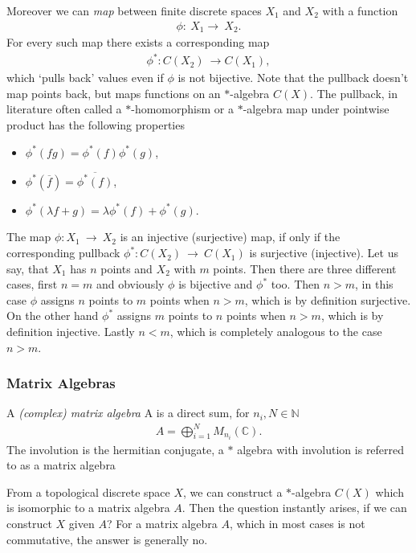 Moreover we can \textit{map} between finite discrete spaces $X_1$ and $X_2$ with a
function
\begin{align}
    \phi:\ X_1 \rightarrow\ X_2.
\end{align}
For every such map there exists a corresponding map
\begin{align}
    \phi ^*:C(X_2)\ \rightarrow C(X_1),
\end{align}
which `pulls back' values even if $\phi$ is not bijective.
Note that the pullback doesn't map points back, but maps functions on an $*$-algebra $C(X)$.
The pullback, in literature often called a $*$-homomorphism or a $*$-algebra map under
pointwise product has the following properties
\begin{itemize}
    \item $\phi ^*(fg) = \phi ^*(f) \phi ^*(g)$,
    \item $\phi ^*(\overline{f}) = \overline{\phi ^*(f)}$,
    \item $\phi ^*(\lambda f + g) = \lambda \phi ^*(f) + \phi ^*(g)$.
\end{itemize}
    The map $\phi :X_1\ \rightarrow \ X_2$ is an injective (surjective) map,
    if only if the corresponding pullback $\phi ^* :C(X_2)\ \rightarrow \
    C(X_1)$ is surjective (injective). Let us say, that $X_1$ has $n$ points and
    $X_2$ with $m$ points. Then there are three different cases, first $n=m$ and
    obviously $\phi$ is bijective and $\phi ^*$ too. Then $n >  m$, in this case
    $\phi$ assigns $n$ points to $m$ points when $n >  m$, which is by definition
    surjective. On the other hand $\phi ^*$ assigns $m$ points to $n$ points when
    $n >  m$, which is by definition injective. Lastly $n < m $, which is
    completely analogous to the case $n > m$.

\subsubsection{Matrix Algebras}
\begin{definition}
    A \textit{(complex) matrix algebra} A is a direct sum, for $n_i, N \in
    \mathbb{N}$
    \begin{align}
        A = \bigoplus _{i=1}^{N} M_{n_i}(\mathbb{C}).
    \end{align}
    The involution is the hermitian conjugate, a $*$ algebra with involution is referred to as
    a matrix algebra
\end{definition}
From a topological discrete space $X$, we can construct a $*$-algebra
$C(X)$ which is isomorphic to a matrix algebra $A$. Then the question instantly
arises, if we can construct $X$ given $A$? For a matrix algebra $A$,
which in most cases is not commutative, the answer is generally no.

